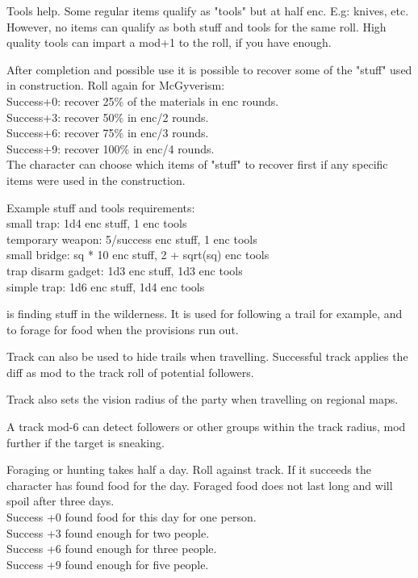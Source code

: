 Tools help. Some regular items qualify as "tools" but at half enc. E.g: knives, etc. However, no items can qualify as both stuff and tools for the same roll. High quality tools can impart a mod+1 to the roll, if you have enough.

After completion and possible use it is possible to recover some of the "stuff" used in construction. Roll again for McGyverism: \\
Success+0: recover 25\% of the materials in enc rounds. \\
Success+3: recover 50\% in enc/2 rounds. \\
Success+6: recover 75\% in enc/3 rounds. \\
Success+9: recover 100\% in enc/4 rounds. \\
The character can choose which items of "stuff" to recover first if any specific items were used in the construction.

Example stuff and tools requirements: \\
small trap: 1d4 enc stuff, 1 enc tools \\
temporary weapon: 5/success enc stuff, 1 enc tools \\
small bridge: sq * 10 enc stuff, 2 + sqrt(sq) enc tools \\
trap disarm gadget: 1d3 enc stuff, 1d3 enc tools \\
simple trap: 1d6 enc stuff, 1d4 enc tools


 is finding stuff in the wilderness. It is used for following a trail for example, and to forage for food when the provisions run out.

Track can also be used to hide trails when travelling. Successful track applies the diff as mod to the track roll of potential followers.

Track also sets the vision radius of the party when travelling on regional maps.

A track mod-6 can detect followers or other groups within the track radius, mod further if the target is sneaking.

Foraging or hunting takes half a day. Roll against track. If it succeeds the character has found food for the day. Foraged food does not last long and will spoil after three days. \\
Success +0 found food for this day for one person. \\
Success +3 found enough for two people. \\
Success +6 found enough for three people. \\
Success +9 found enough for five people.

